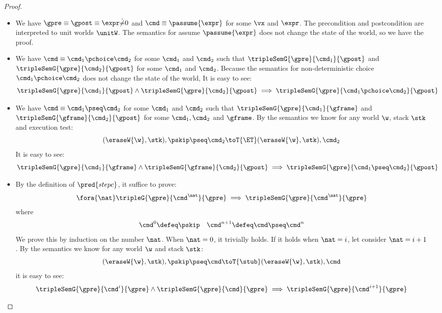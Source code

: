 \begin{proof}
\begin{itemize}
\item {}
We have \( \gpre \equiv \gpost \equiv \expr \dot\neq 0\) and \( \cmd \equiv \passume{\expr}\) for some \( \vx \) and \( \expr \).
The precondition and postcondition are interpreted to unit worlds \( \unitW\).
The semantics for assume \( \passume{\expr} \) does not change the state of the world, so we have the proof.

\item {}
We have \( \cmd \equiv \cmd_1 \pchoice \cmd_2 \) for some \( \cmd_1 \) and \( \cmd_2 \) such that \( \tripleSemG{\gpre}{\cmd_1}{\gpost} \) and \( \tripleSemG{\gpre}{\cmd_2}{\gpost} \) for some \( \cmd_1 \) and \( \cmd_2 \).
Because the semantics for non-deterministic choice \( \cmd_1 \pchoice \cmd_2 \) does not change the state of the world, It is easy to see:
\[
    \tripleSemG{\gpre}{\cmd_1}{\gpost} \land \tripleSemG{\gpre}{\cmd_2}{\gpost} \implies \tripleSemG{\gpre}{\cmd_1 \pchoice \cmd_2}{\gpost}
\]

\item {}
We have \( \cmd \equiv \cmd_1 \pseq \cmd_2 \) for some \( \cmd_1 \) and \( \cmd_2 \) such that \( \tripleSemG{\gpre}{\cmd_1}{\gframe} \) and \( \tripleSemG{\gframe}{\cmd_2}{\gpost} \) for some \( \cmd_1, \cmd_2\) and \( \gframe \).
By the semantics  we know for any world \( \w \), stack \( \stk \) and execution test:
\[
    (\eraseW{\w}, \stk), \pskip \pseq \cmd_2 \toT{\ET} (\eraseW{\w}, \stk), \cmd_2
\]
It is easy to see:
\[
    \tripleSemG{\gpre}{\cmd_1 }{\gframe} \land \tripleSemG{\gframe}{\cmd_2}{\gpost} \implies \tripleSemG{\gpre}{\cmd_1 \pseq \cmd_2}{\gpost}
\]

\item {}
By the definition of \( \pred{stepc}\), it suffice to prove:
\[
    \fora{\nat} \tripleG{\gpre}{\cmd^{\nat}}{\gpre} \implies \tripleSemG{\gpre}{\cmd^{\nat}}{\gpre} 
\]
where
\[
    \cmd^{0} \defeq \pskip \quad \cmd^{n + 1} \defeq \cmd \pseq \cmd^{n}
\]
We prove this by induction on the number \( \nat \).
When \( \nat = 0 \), it trivially holds.
If it holds when \( \nat = i\), let consider \( \nat = i + 1 \).
By the semantics  we know for any world \( \w \) and stack \( \stk \):
\[
    (\eraseW{\w}, \stk), \pskip \pseq \cmd \toT{\stub} (\eraseW{\w}, \stk), \cmd
\]
it is easy to see:
\[
    \tripleSemG{\gpre}{\cmd^{i}}{\gpre} \land \tripleSemG{\gpre}{\cmd}{\gpre} \implies \tripleSemG{\gpre}{\cmd^{i+1}}{\gpre} 
\]


\end{itemize}
\end{proof}
